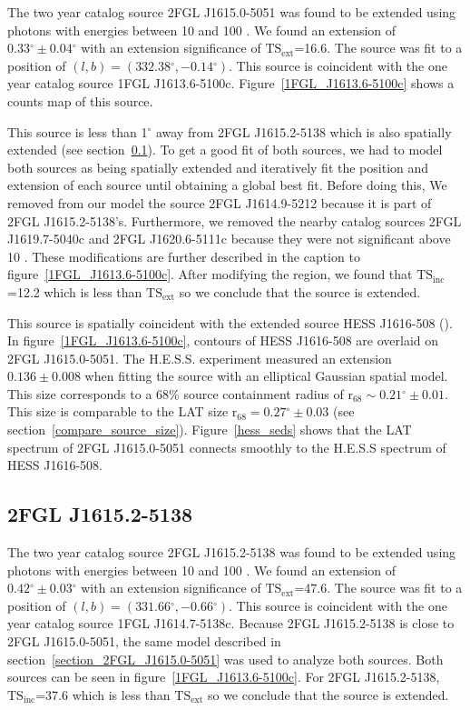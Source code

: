 \documentclass[12pt,preprint]{aastex}
\newcommand{\gev}{\text{GeV}\xspace}
\newcommand{\tev}{\text{TeV}\xspace}
\newcommand{\tsext}{{\ensuremath{\text{TS}_\text{ext}}}\xspace}
\newcommand{\tsinc}{\ensuremath{\text{TS}_\text{inc}}\xspace}
\newcommand{\rsixeight}{{\ensuremath{\text{r}_{68}}}\xspace}
\renewcommand{\deg}{\ensuremath{^\circ}\xspace}
\begin{document}
The two year catalog source 2FGL J1615.0-5051 was found to be
extended using photons with energies between 10 \gev and 100 \gev.
We found an extension of $0.33\deg\pm0.04\deg$ with an extension
significance of \tsext=16.6.  The source was fit to a position of
$(l,b)=(332.38\deg,-0.14\deg)$.  This source is coincident with the one
year catalog source 1FGL J1613.6-5100c.  Figure~\ref{1FGL_J1613.6-5100c}
shows a counts map of this source.

This source is less than 1\deg away from 2FGL J1615.2-5138 which is
also spatially extended (see section~\ref{section_2FGL_J1615.2-5138}).
To get a good fit of both sources, we had to model both sources as
being spatially extended and iteratively fit the position and extension
of each source until obtaining a global best fit.  Before doing this,
We removed from our model the source 2FGL J1614.9-5212 because it is
part of 2FGL J1615.2-5138's. Furthermore, we removed
the nearby catalog sources 2FGL J1619.7-5040c and 2FGL J1620.6-5111c
because they were not significant above 10 \gev.  These modifications
are further described in the caption to figure~\ref{1FGL_J1613.6-5100c}.
After modifying the region, we found that \tsinc=12.2 which is less than
\tsext so we conclude that the source is extended.

This source is spatially coincident with the extended \tev source HESS
J1616-508 (\cite{hess_plane_survey}).  In figure~\ref{1FGL_J1613.6-5100c},
contours of HESS J1616-508 are overlaid on 2FGL J1615.0-5051.
The H.E.S.S. experiment measured an extension $0.136\pm 0.008$
when fitting the source with an elliptical Gaussian spatial model.
This size corresponds to a 68\% source containment radius of
$\rsixeight\sim0.21\deg\pm0.01$. This size is comparable to the LAT size
$\rsixeight=0.27\deg\pm0.03$ (see section~\ref{compare_source_size}).
Figure~\ref{hess_seds} shows that the LAT spectrum of
2FGL J1615.0-5051 connects smoothly to the 
H.E.S.S spectrum of HESS J1616-508.


\subsection{2FGL J1615.2-5138}
\label{section_2FGL_J1615.2-5138}

The two year catalog source 2FGL J1615.2-5138 was found to be
extended using photons with energies between 10 \gev and 100 \gev.
We found an extension of $0.42\deg\pm0.03\deg$ with an extension
significance of \tsext=47.6.  The source was fit to a position
of $(l,b)=(331.66\deg,-0.66\deg)$.  This source is coincident
with the one year catalog source 1FGL J1614.7-5138c.  Because 2FGL
J1615.2-5138 is close to 2FGL J1615.0-5051, the same model described
in section~\ref{section_2FGL_J1615.0-5051} was used to analyze both
sources. Both sources can be seen in figure~\ref{1FGL_J1613.6-5100c}.
For 2FGL J1615.2-5138, \tsinc=37.6 which is less than \tsext so we
conclude that the source is extended.
\end{document}
